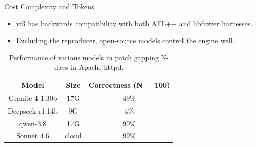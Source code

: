 \begin{frame}{Cost Complexity and Tokens}
    \begin{itemize}
        \item vf3 has backwards compatibility with both AFL++ and libfuzzer harnesses.
        \item Excluding the reproducer, open-source models control the engine well.
    \end{itemize}

    \vspace{0.33cm}
    \begin{table}
        \begin{tabular}{c|c|c}
            Model & Size & Correctness (N = 100) \\
            \hline
            Granite 4-1:30b & 17G & 49\% \\
            Deepseek-r1:14b & 9G & 4\% \\
            qwen-3.8 & 17G & 90\% \\
            Sonnet 4.6 & cloud & 99\% \\
        \end{tabular}
        \caption{Performance of various models in patch gapping N-days in Apache httpd.}
    \end{table}
    \vspace{-0.25cm}
\end{frame}
